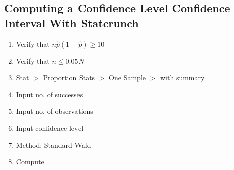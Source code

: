 \documentclass{report}
\begin{document}
        \subsection*{Computing a Confidence Level Confidence Interval With Statcrunch}
        \bigbreak \noindent 
        \begin{enumerate}
          \item Verify that $n\hat{p}(1-\hat{p}) \geq 10 $ 
          \item Verify that $n \leq 0.05N $
             \item Stat $>$ Proportion Stats $> $ One Sample $> $ with summary
            \item Input no. of successes
            \item Input no. of observations
            \item Input confidence level
            \item Method: Standard-Wald
            \item Compute
        \end{enumerate}

        \bigbreak \noindent 
\end{document}
